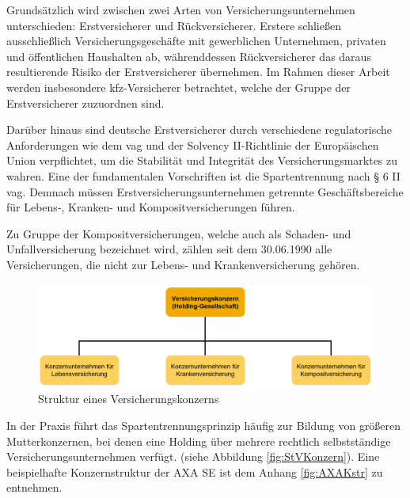 Grundsätzlich wird zwischen zwei Arten von Versicherungsunternehmen unterschieden: Erstversicherer und Rückversicherer. Erstere schließen ausschließlich Versicherungsgeschäfte mit gewerblichen Unternehmen, privaten und öffentlichen Haushalten ab, währenddessen Rückversicherer das daraus resultierende Risiko der Erstversicherer übernehmen.\autocite[Vgl.][S. 240f.]{FARNY2011} Im Rahmen dieser Arbeit werden insbesondere \ac{kfz}-Versicherer betrachtet, welche der Gruppe der Erstversicherer zuzuordnen sind.

Darüber hinaus sind deutsche Erstversicherer durch verschiedene regulatorische Anforderungen wie dem \ac{vag} und der Solvency II-Richtlinie der Europäischen Union verpflichtet, um die Stabilität und Integrität des Versicherungsmarktes zu wahren. \autocite[Vgl.][]{BAFIN2016} Eine der fundamentalen Vorschriften ist die Spartentrennung nach § 6 II \ac{vag}. Demnach müssen Erstversicherungsunternehmen getrennte Geschäftsbereiche für Lebens-, Kranken- und Kompositversicherungen führen. 

Zu Gruppe der Kompositversicherungen, welche auch als Schaden- und Unfallversicherung bezeichnet wird, zählen seit dem 30.06.1990 alle Versicherungen, die nicht zur Lebens- und Krankenversicherung gehören. \autocite[Vgl.][S. 241-243]{FARNY2011} 


\begin{figure}[h]
    \centering
    \includegraphics[width=1\textwidth]{img/Struktur_VKonzern2.jpg}
    \caption[Struktur eines Versicherungskonzerns]{Struktur eines Versicherungskonzerns\autocite{StVKonzern}}
    \label{fig:StVKonzern}
\end{figure}


In der Praxis führt das Spartentrennungsprinzip häufig zur Bildung von größeren Mutterkonzernen, bei denen eine Holding über mehrere rechtlich selbstständige Versicherungsunternehmen verfügt. (siehe Abbildung \vref{fig:StVKonzern}). Eine beispielhafte Konzernstruktur der AXA SE ist dem Anhang \ref{fig:AXAKstr} zu entnehmen. 

